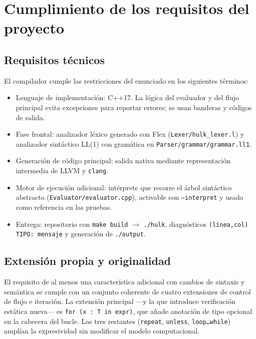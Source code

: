 \documentclass[11pt,a4paper]{article}
\begin{document}
\section{Cumplimiento de los requisitos del proyecto}

\subsection{Requisitos técnicos}

El compilador cumple las restricciones del enunciado en los siguientes términos:

\begin{itemize}
  \item Lenguaje de implementación: C++17. La lógica del evaluador y del flujo principal evita excepciones para reportar errores; se usan banderas y códigos de salida.
  \item Fase frontal: analizador léxico generado con Flex (\texttt{Lexer/hulk\_lexer.l}) y analizador sintáctico LL(1) con gramática en \texttt{Parser/grammar/grammar.ll1}.
  \item Generación de código principal: salida nativa mediante representación intermedia de LLVM y \texttt{clang}.
  \item Motor de ejecución adicional: intérprete que recorre el árbol sintáctico abstracto (\texttt{Evaluator/evaluator.cpp}), activable con \texttt{--interpret} y usado como referencia en las pruebas.
  \item Entrega: repositorio con \texttt{make build} $\rightarrow$ \texttt{./hulk}, diagnósticos \texttt{(línea,col) TIPO: mensaje} y generación de \texttt{./output}.
\end{itemize}

\subsection{Extensión propia y originalidad}

El requisito de al menos una característica adicional con cambios de sintaxis y semántica se cumple con un conjunto coherente de cuatro extensiones de control de flujo e iteración. La extensión principal ---y la que introduce verificación estática nueva--- es \texttt{for (x : T in expr)}, que añade anotación de tipo opcional en la cabecera del bucle. Las tres restantes (\texttt{repeat}, \texttt{unless}, \texttt{loop\ldots while}) amplían la expresividad sin modificar el modelo computacional.
\end{document}
